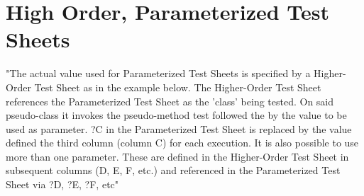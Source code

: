 

\section{High Order, Parameterized Test Sheets}
"The actual value used for Parameterized Test Sheets is specified by a Higher-Order Test Sheet as in the example below. 
The Higher-Order Test Sheet references the Parameterized Test Sheet as the 'class' being tested. 
On said pseudo-class it invokes the pseudo-method test followed the by the value to be used as parameter. 
?C in the Parameterized Test Sheet is replaced by the value defined the third column (column C) for each execution.
It is also possible to use more than one parameter. These are defined in the Higher-Order Test Sheet in subsequent columns (D, E, F, etc.) and referenced in the Parameterized Test Sheet via ?D, ?E, ?F, etc"\cite{tsh}
